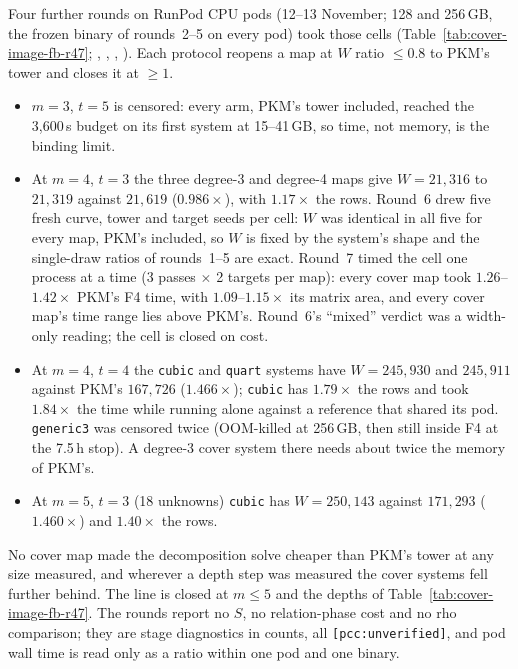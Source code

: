 Four further rounds on RunPod CPU pods (12--13 November; 128 and 256\,GB,
the frozen binary of rounds~2--5 on every pod) took those cells
(Table~\ref{tab:cover-image-fb-r47};
,
,
,
). Each protocol
reopens a map at $W$ ratio $\le0.8$ to PKM's tower and closes it at $\ge1$.
\begin{itemize}
\item $m=3$, $t=5$ is censored: every arm, PKM's tower included, reached the
  3{,}600\,s budget on its first system at 15--41\,GB, so time, not memory,
  is the binding limit.
\item At $m=4$, $t=3$ the three degree-3 and degree-4 maps give $W=21{,}316$
  to $21{,}319$ against $21{,}619$ ($0.986\times$), with $1.17\times$ the rows.
  Round~6 drew five fresh curve, tower and target seeds per cell: $W$ was
  identical in all five for every map, PKM's included, so $W$ is fixed by
  the system's shape and the single-draw ratios of rounds~1--5 are exact.
  Round~7 timed the cell one process at a time (3 passes $\times$ 2 targets per
  map): every cover map took $1.26$--$1.42\times$ PKM's F4 time, with
  $1.09$--$1.15\times$ its matrix area, and every cover map's time range lies
  above PKM's. Round~6's ``mixed'' verdict was a width-only reading; the cell
  is closed on cost.
\item At $m=4$, $t=4$ the \texttt{cubic} and \texttt{quart} systems have
  $W=245{,}930$ and $245{,}911$ against PKM's $167{,}726$ ($1.466\times$);
  \texttt{cubic} has $1.79\times$ the rows and took $1.84\times$ the time while
  running alone against a reference that shared its pod. \texttt{generic3}
  was censored twice (OOM-killed at 256\,GB, then still inside F4 at the
  7.5\,h stop). A degree-3 cover system there needs about twice the memory
  of PKM's.
\item At $m=5$, $t=3$ (18 unknowns) \texttt{cubic} has $W=250{,}143$ against
  $171{,}293$ ($1.460\times$) and $1.40\times$ the rows.
\end{itemize}
No cover map made the decomposition solve cheaper than PKM's tower at any
size measured, and wherever a depth step was measured the cover systems
fell further behind. The line is closed at $m\le5$ and the depths of
Table~\ref{tab:cover-image-fb-r47}. The rounds report no $S$, no
relation-phase cost and no rho comparison; they are stage diagnostics in
counts, all \texttt{[pcc:unverified]}, and pod wall time is read only as a
ratio within one pod and one binary.

